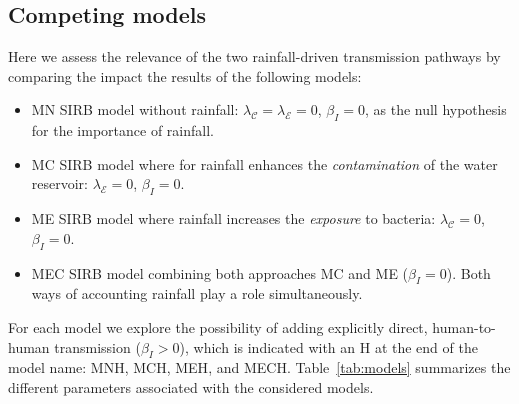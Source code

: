 \subsection{Competing models}
Here we assess the relevance of the two rainfall-driven transmission pathways by comparing the impact the results of the following models:
\begin{itemize}
 \item \textsc{MN} SIRB model without rainfall: $\lambda_{\mathcal{C}} = \lambda_{\mathcal{E}} = 0$, $\beta_{I} = 0$, as the null hypothesis for the importance of rainfall.
  \item \textsc{MC} SIRB model where for rainfall enhances the \textit{contamination} of the water reservoir: $\lambda_{\mathcal{E}} = 0$, $\beta_{I} = 0$. 
  \item \textsc{ME} SIRB model where rainfall increases the \textit{exposure} to bacteria: $\lambda_{\mathcal{C}} = 0$, $\beta_{I} = 0$. 
  \item \textsc{MEC} SIRB model combining both approaches \textsc{MC} and \textsc{ME} ($\beta_{I} = 0$). Both ways of accounting rainfall play a role simultaneously.
\end{itemize}

 For each model we explore the possibility of adding explicitly direct, human-to-human transmission ($\beta_{I} > 0$), which is indicated with an \textsc{H} at the end of the model name: \textsc{MNH}, \textsc{MCH}, \textsc{MEH}, and \textsc{MECH}. Table~\ref{tab:models} summarizes the different parameters associated with the considered models.

